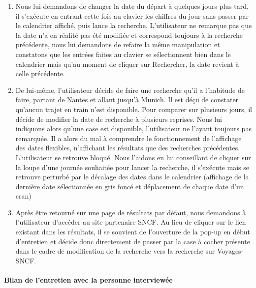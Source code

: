 \begin{enumerate}
\item Nous lui demandons de changer la date du d\'{e}part \`{a} quelques jours plus tard, il s'ex\'{e}cute en entrant cette fois au clavier les chiffres du jour sans passer par le calendrier affich\'{e}, puis lance la recherche. L'utilisateur ne remarque pas que la date n'a en r\'{e}alit\'{e} pas \'{e}t\'{e} modifi\'{e}e et correspond toujours \`{a} la recherche pr\'{e}c\'{e}dente, nous lui demandons de refaire la m\^{e}me manipulation et constatons que les entr\'{e}es faites au clavier se s\'{e}lectionnent bien dans le calendrier mais qu'au moment de cliquer sur Rechercher, la date revient \`{a} celle pr\'{e}c\'{e}dente.


\item De lui-m\^{e}me, l'utilisateur d\'{e}cide de faire une recherche qu'il a l'habitude de faire, partant de Nantes et allant jusqu'\`{a} Munich. Il est d\'{e}\c{c}u de constater qu'aucun trajet en train n'est disponible. Pour comparer sur plusieurs jours, il d\'{e}cide de modifier la date de recherche \`{a} plusieurs reprises. Nous lui indiquons alors qu'une case  est disponible, l'utilisateur ne l'ayant toujours pas remarqu\'{e}e. Il a alors du mal \`{a} comprendre le fonctionnement de l'affichage des dates flexibles, n'affichant les r\'{e}sultats que des recherches pr\'{e}c\'{e}dentes. L'utilisateur se retrouve bloqu\'{e}. Nous l'aidons en lui conseillant de cliquer sur la loupe d'une journ\'{e}e souhait\'{e}e pour lancer la recherche, il s'ex\'{e}cute mais se retrouve perturb\'{e} par le d\'{e}calage des dates dans le calendrier (affichage de la derni\`{e}re date s\'{e}lectionn\'{e}e en gris fonc\'{e} et d\'{e}placement de chaque date d'un cran)


\item Apr\`{e}s \^{e}tre retourn\'{e} sur une page de r\'{e}sultats par d\'{e}faut, nous demandons \`{a} l'utilisateur d'acc\'{e}der au site partenaire SNCF. Au lieu de cliquer sur le lien existant dans les r\'{e}sultats, il se souvient de l'ouverture de la pop-up en d\'{e}but d'entretien et d\'{e}cide donc directement de passer par la case \`{a} cocher pr\'{e}sente dans le cadre de modification de la recherche vers la recherche sur Voyages-SNCF.

\end{enumerate}

\paragraph{Bilan de l'entretien avec la personne interview\'{e}e}


